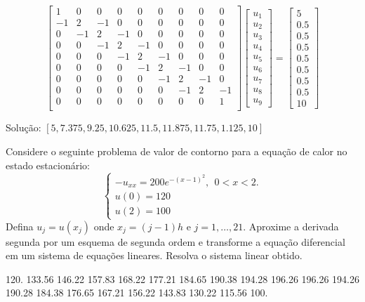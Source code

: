 \begin{resp}
$$\left[
  \begin{array}{ccccccccc}
         1 & 0& 0& 0& 0& 0& 0& 0& 0\\
         -1 & 2 & -1 &0&0& 0& 0& 0& 0\\
         0&-1 & 2 & -1 &0& 0& 0& 0& 0\\
         0&0&-1 & 2 & -1 & 0& 0& 0& 0\\
         0&0&0&-1 & 2 & -1 & 0& 0& 0\\
         0&0&0&0&-1 & 2 & -1 & 0& 0\\
         0&0&0&0&0&-1 & 2 & -1 & 0\\
         0&0&0&0&0&0&-1 & 2 & -1\\
         0 & 0& 0& 0& 0& 0& 0& 0& 1\\
        \end{array}
\right]
\left[
  \begin{array}{c}
     u_1\\ u_2\\u_3\\u_4 \\u_5\\ u_6\\u_7\\u_8\\u_9
   \end{array}
\right]
=
\left[
  \begin{array}{c}
     5\\ 0.5\\0.5\\0.5\\ 0.5\\0.5\\0.5\\0.5 \\ 10
   \end{array}
\right]
$$

Solução:  $[5, 7.375, 9.25, 10.625, 11.5, 11.875, 11.75, 1.125, 10]$
\end{resp}


\begin{exer} Considere o seguinte problema de valor de contorno para a equação de calor no estado estacionário:
$$\left\{\begin{array}{l}-u_{xx}=200e^{-(x-1)^2},~~ 0<x<2.\\
u(0)=120\\
u(2)=100\end{array}
\right.
$$
Defina $u_j=u(x_j)$ onde $x_j={(j-1)}{h}$ e $j=1,\ldots,21$. Aproxime a derivada segunda por um esquema de segunda ordem e transforme a equação diferencial em um sistema de equações lineares. Resolva o sistema linear obtido.
\end{exer}
\begin{resp}
120.    133.56    146.22    157.83    168.22    177.21    184.65    190.38    194.28    196.26    196.26    194.26    190.28    184.38    176.65    167.21  156.22    143.83    130.22    115.56    100.    
\end{resp}

